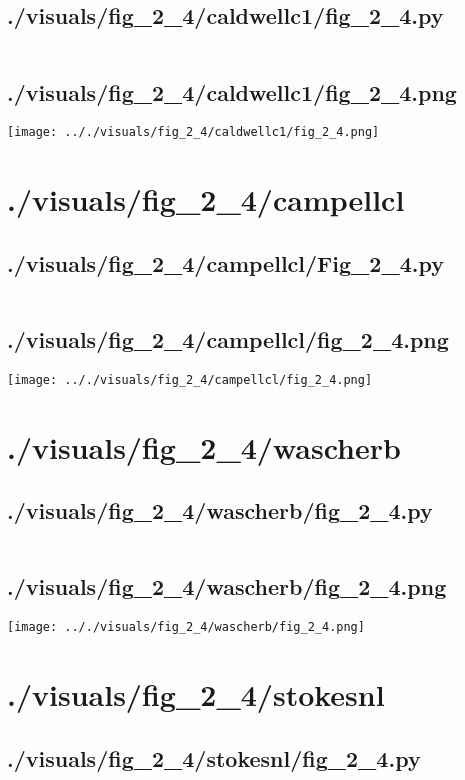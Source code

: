 \documentclass{report}
\begin{document}
    \subsection{./visuals/fig\_2\_4/caldwellc1/fig\_2\_4.py}
    \inputminted[breaklines=true]{python}{.././visuals/fig_2_4/caldwellc1/fig_2_4.py}
    \subsection{./visuals/fig\_2\_4/caldwellc1/fig\_2\_4.png}
    \texttt{[image: .././visuals/fig\_2\_4/caldwellc1/fig\_2\_4.png]}
    \pagebreak
    \section{./visuals/fig\_2\_4/campellcl}
    \subsection{./visuals/fig\_2\_4/campellcl/Fig\_2\_4.py}
    \inputminted[breaklines=true]{python}{.././visuals/fig_2_4/campellcl/Fig_2_4.py}
    \subsection{./visuals/fig\_2\_4/campellcl/fig\_2\_4.png}
    \texttt{[image: .././visuals/fig\_2\_4/campellcl/fig\_2\_4.png]}
    \pagebreak
    \section{./visuals/fig\_2\_4/wascherb}
    \subsection{./visuals/fig\_2\_4/wascherb/fig\_2\_4.py}
    \inputminted[breaklines=true]{python}{.././visuals/fig_2_4/wascherb/fig_2_4.py}
    \subsection{./visuals/fig\_2\_4/wascherb/fig\_2\_4.png}
    \texttt{[image: .././visuals/fig\_2\_4/wascherb/fig\_2\_4.png]}
    \pagebreak
    \section{./visuals/fig\_2\_4/stokesnl}
    \subsection{./visuals/fig\_2\_4/stokesnl/fig\_2\_4.py}
    \inputminted[breaklines=true]{python}{.././visuals/fig_2_4/stokesnl/fig_2_4.py}
\end{document}
